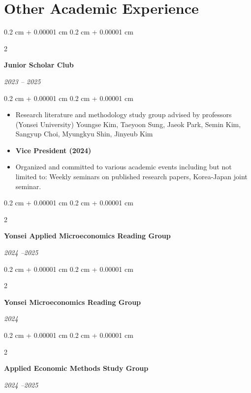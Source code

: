 \documentclass[10pt, letterpaper]{article}
\newenvironment{highlights}{
	\begin{itemize}[
		topsep=0.10 cm,
		parsep=0.10 cm,
		partopsep=0pt,
		itemsep=0pt,
		leftmargin=0.4 cm + 10pt
		]
	}{
	\end{itemize}
} %
\newenvironment{onecolentry}{
	\begin{adjustwidth}{
			0.2 cm + 0.00001 cm
		}{
			0.2 cm + 0.00001 cm
		}
	}{
	\end{adjustwidth}
} %
\newenvironment{twocolentry}[2][]{
	\onecolentry
	\def\secondColumn{#2}
	\setcolumnwidth{\fill, 4.5 cm}
	\begin{paracol}{2}
	}{
		\switchcolumn \raggedleft \secondColumn
	\end{paracol}
	\endonecolentry
} %
\begin{document}
	
\section{Other Academic Experience}
	
	\begin{twocolentry}{
			
			
			\textit{2023 – 2025}}
		\textbf{Junior Scholar Club}
	\end{twocolentry}
	
	\vspace{0.10 cm}
	\begin{onecolentry}
	\begin{highlights}
		\item Research literature and methodology study group advised by professors (Yonsei University) Youngse Kim, Taeyoon Sung, Jaeok Park, Semin Kim, Sangyup Choi, Myungkyu Shin, Jinyeub Kim
		\item \textbf{Vice President (2024)}
		\item Organized and committed to various academic events including but not limited to: Weekly seminars on published research papers, Korea-Japan
		joint seminar.
	\end{highlights}
\end{onecolentry}
	
	
	\vspace{0.2 cm}
	
	\begin{twocolentry}{
			
			
			\textit{2024 –2025}}
		\textbf{Yonsei Applied Microeconomics Reading Group}
	\end{twocolentry}

	
		\vspace{0.2 cm}
	
	
	\begin{twocolentry}{
			
			
			\textit{2024 }}
		\textbf{Yonsei Microeconomics Reading Group}
	\end{twocolentry}
	
	\vspace{0.2 cm}
	
	\begin{twocolentry}{
			
			
			\textit{2024 –2025}}
		\textbf{Applied Economic Methods Study Group}
	\end{twocolentry}
	
\end{document}
